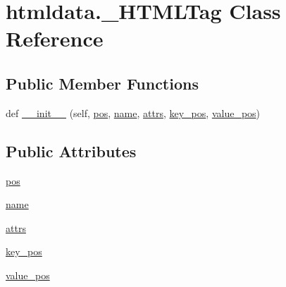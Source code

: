 \hypertarget{classhtmldata_1_1___h_t_m_l_tag}{}\section{htmldata.\+\_\+\+H\+T\+M\+L\+Tag Class Reference}
\label{classhtmldata_1_1___h_t_m_l_tag}
\subsection*{Public Member Functions}
\begin{DoxyCompactItemize}
\item 
def \hyperlink{classhtmldata_1_1___h_t_m_l_tag_a05b4889d844b5c6f9a2060779984e2d2}{\+\_\+\+\_\+init\+\_\+\+\_\+} (self, \hyperlink{classhtmldata_1_1___h_t_m_l_tag_a83f30fbb4fde1ae83d802de453a175d1}{pos}, \hyperlink{lib_2expat_8h_a1b49b495b59f9e73205b69ad1a2965b0}{name}, \hyperlink{classhtmldata_1_1___h_t_m_l_tag_ab15674e7f9986a765b36207fd10ddc6d}{attrs}, \hyperlink{classhtmldata_1_1___h_t_m_l_tag_a6e524b4ab24c67e27fe3c9cd6e60cbe0}{key\+\_\+pos}, \hyperlink{classhtmldata_1_1___h_t_m_l_tag_adbf9db53357627841ef60cf8de939886}{value\+\_\+pos})
\end{DoxyCompactItemize}
\subsection*{Public Attributes}
\begin{DoxyCompactItemize}
\item 
\hyperlink{classhtmldata_1_1___h_t_m_l_tag_a83f30fbb4fde1ae83d802de453a175d1}{pos}
\item 
\hyperlink{classhtmldata_1_1___h_t_m_l_tag_a9c00ba352b6a40772ec5aec30007d1c5}{name}
\item 
\hyperlink{classhtmldata_1_1___h_t_m_l_tag_ab15674e7f9986a765b36207fd10ddc6d}{attrs}
\item 
\hyperlink{classhtmldata_1_1___h_t_m_l_tag_a6e524b4ab24c67e27fe3c9cd6e60cbe0}{key\+\_\+pos}
\item 
\hyperlink{classhtmldata_1_1___h_t_m_l_tag_adbf9db53357627841ef60cf8de939886}{value\+\_\+pos}
\end{DoxyCompactItemize}


